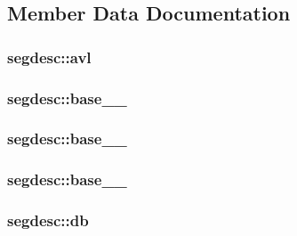 \subsection{Member Data Documentation}
\subsubsection[{\texorpdfstring{avl}{avl}}]{ segdesc\+::avl}\hypertarget{structsegdesc_a6623d25de54a0a87d7a43ea4dfe7783f}{}\label{structsegdesc_a6623d25de54a0a87d7a43ea4dfe7783f}
\subsubsection[{\texorpdfstring{base\+\_\+15\+\_\+0}{base_15_0}}]{ segdesc\+::base\+\_\+\_}\hypertarget{structsegdesc_aaf95dd5b9105cf5729de49eb2542072a}{}\label{structsegdesc_aaf95dd5b9105cf5729de49eb2542072a}
\subsubsection[{\texorpdfstring{base\+\_\+23\+\_\+16}{base_23_16}}]{ segdesc\+::base\+\_\+\_}\hypertarget{structsegdesc_aa5cff1f1ddfac386e2268108c8f5b6c2}{}\label{structsegdesc_aa5cff1f1ddfac386e2268108c8f5b6c2}
\subsubsection[{\texorpdfstring{base\+\_\+31\+\_\+24}{base_31_24}}]{ segdesc\+::base\+\_\+\_}\hypertarget{structsegdesc_a164a6a2e75fc62e61daef3ddab7f3169}{}\label{structsegdesc_a164a6a2e75fc62e61daef3ddab7f3169}
\subsubsection[{\texorpdfstring{db}{db}}]{ segdesc\+::db}\hypertarget{structsegdesc_a08edbd480d21bfd147e304b6f5a3788f}{}\label{structsegdesc_a08edbd480d21bfd147e304b6f5a3788f}
